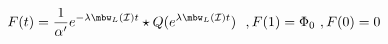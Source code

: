 \begin{equation}
F(t)=\frac{1}{\alpha'}
e^{-\lambda\mbw_L(\mathcal{I})t}\star
Q(e^{\lambda\mbw_L(\mathcal{I})t}) \ \ ,
F(1)=\Phi_0 \ , F(0)=0 
\end{equation}

